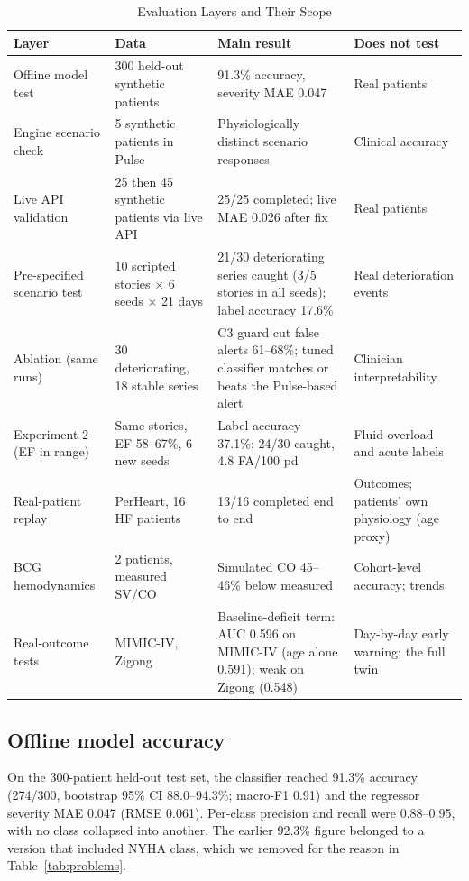 \documentclass[conference]{IEEEtran}
\begin{document}
\begin{table}[!t]
\centering
\caption{Evaluation Layers and Their Scope}
\label{tab:evalsummary}
\footnotesize
\begin{tabularx}{\textwidth}{@{}P{3.2cm}P{3.6cm}YP{3.4cm}@{}}
\toprule
\textbf{Layer} & \textbf{Data} & \textbf{Main result} & \textbf{Does not test} \\
\midrule
Offline model test & 300 held-out synthetic patients & 91.3\% accuracy, severity MAE 0.047 & Real patients \\
Engine scenario check & 5 synthetic patients in Pulse & Physiologically distinct scenario responses & Clinical accuracy \\
Live API validation & 25 then 45 synthetic patients via live API & 25/25 completed; live MAE 0.026 after fix & Real patients \\
Pre-specified scenario test & 10 scripted stories $\times$ 6 seeds $\times$ 21 days & 21/30 deteriorating series caught (3/5 stories in all seeds); label accuracy 17.6\% & Real deterioration events \\
Ablation (same runs) & 30 deteriorating, 18 stable series & C3 guard cut false alerts 61--68\%; tuned classifier matches or beats the Pulse-based alert & Clinician interpretability \\
Experiment 2 (EF in range) & Same stories, EF 58--67\%, 6 new seeds & Label accuracy 37.1\%; 24/30 caught, 4.8 FA/100 pd & Fluid-overload and acute labels \\
Real-patient replay & PerHeart, 16 HF patients & 13/16 completed end to end & Outcomes; patients' own physiology (age proxy) \\
BCG hemodynamics & 2 patients, measured SV/CO & Simulated CO 45--46\% below measured & Cohort-level accuracy; trends \\
Real-outcome tests & MIMIC-IV, Zigong & Baseline-deficit term: AUC 0.596 on MIMIC-IV (age alone 0.591); weak on Zigong (0.548) & Day-by-day early warning; the full twin \\
\bottomrule
\end{tabularx}
\end{table}

\subsection{Offline model accuracy}\label{sec:offline}
On the 300-patient held-out test set, the classifier reached 91.3\% accuracy (274/300, bootstrap 95\% CI 88.0--94.3\%; macro-F1 0.91) and the regressor severity MAE 0.047 (RMSE 0.061). Per-class precision and recall were 0.88--0.95, with no class collapsed into another. The earlier 92.3\% figure belonged to a version that included NYHA class, which we removed for the reason in Table~\ref{tab:problems}.
\end{document}

